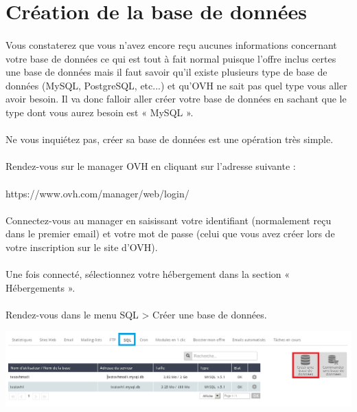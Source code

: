 \documentclass[10pt,a4paper]{article}
\begin{document}
\section{Création de la base de données}
\paragraph{}Vous constaterez que vous n'avez encore reçu aucunes informations concernant votre base de données ce qui est tout à fait normal puisque l'offre inclus certes une base de données mais il faut savoir qu'il existe plusieurs type de base de données (MySQL, PostgreSQL, etc...) et qu'OVH ne sait pas quel type vous aller avoir besoin. Il va donc falloir aller créer votre base de données en sachant que le type dont vous aurez besoin est « MySQL ».
\paragraph{}Ne vous inquiétez pas, créer sa base de données est une opération très simple.
\paragraph{}Rendez-vous sur le manager OVH en cliquant sur l'adresse suivante :
\paragraph{}https://www.ovh.com/manager/web/login/
\paragraph{}Connectez-vous au manager en saisissant votre identifiant (normalement reçu dans le premier email) et votre mot de passe (celui que vous avez créer lors de votre inscription sur le site d'OVH).
\paragraph{}Une fois connecté, sélectionnez votre hébergement dans la section « Hébergements ».
\paragraph{}Rendez-vous dans le menu SQL > Créer une base de données.
\begin{center}
\includegraphics[scale=0.4]{img/0293.png}
\end{center}
\end{document}
